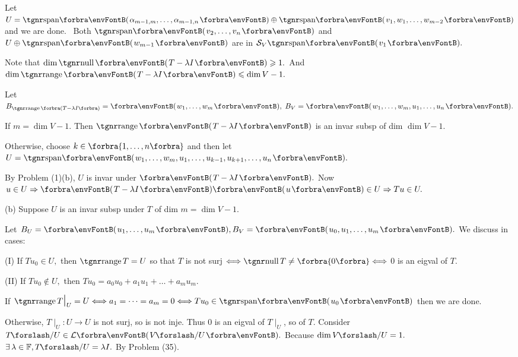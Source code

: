 \documentclass[a4paper, 11pt, UTF8]{article}
\begin{document}
\begin{large}
Let $U=\Span{\alpha_{m-1,m},\dots,\alpha_{m-1,n}}\oplus\Span{v_1,w_1,\dots,w_{m-2}}$ and we are done.\PfEnd\quad\Ha
\Comment \,\,\,Both $\Span{v_2,\dots,v_n}$ and $U\oplus\Span{w_{m-1}}$ are in $\mathcal{S}_V \Span{v_1}.$\par\quad\Ha
{}\par\vspace{6pt}\quad\Ha
\Or Note that $\dim\null\Par{T-\lambda I}\geqslant 1.$ And $\dim\range\Par{T-\lambda I}\leqslant\dim V-1.$\par\quad\Ha
Let $B_{\range\SmallPar{T-\lambda I}}=\Par{w_1,\dots,w_m},\;B_V=\Par{w_1,\dots,w_m,u_1,\dots,u_n}.$\par\quad\Ha
If $m=\dim V-1.$  Then $\range\Par{T-\lambda I}$ is an invar subsp of dim $\dim V-1.$\par\quad\Ha
Otherwise, choose $k\in\Bra{1,\dots,n}$ and then let $U=\Span{w_1,\dots,w_m,u_1,\dots,u_{k-1},u_{k+1},\dots,u_n}.$\par\quad\Ha
By Problem (1)(b), $U$ is invar under $\Par{T-\lambda I}.$ Now $u\in U\Rightarrow \Par{T-\lambda I}\Par{u}\in U\Rightarrow Tu\in U.$\par\vspace{6pt}\quad
(b) Suppose $U$ is an invar subsp under $T$ of dim $m=\dim V-1.$ \par\quad\Hb
Let $B_U=\Par{u_1,\dots,u_m},B_V=\Par{u_0,u_1,\dots,u_m}.$ We discuss in cases:\par\quad\Hb
(I) If $Tu_0\in U,$ then $\range T=U$ so that $T$ is not surj $\Longleftrightarrow \null T\neq\zeroSubs\Longleftrightarrow$ $0$ is an eigval of $T.$\par\quad\Hb\EndI
(II) If $Tu_0\not\in U,$ then $Tu_0=a_0 u_0+a_1 u_1+\dots+a_mu_m.$\par\quad\Hb\EndII
If $\range T\mid_U=U\Longleftrightarrow a_1=\dots=a_m=0\Longleftrightarrow Tu_0\in\Span{u_0}$ then we are done.\par\quad\Hb\EndII
Otherwise, $T\mid_U:U\rightarrow U$ is not surj, so is not inje. Thus $0$ is an eigval of $T\mid_U$, so of $T.$\PfEnd\vspace{4pt}\quad\Hb
\Or Consider $T\mySlash U\in\Lm{V\mySlash U}.$ Because $\dim V\mySlash U=1.$ $\exists\,\lambda\in\Fbb,T\mySlash U=\lambda I.$ By Problem (35).\PfEnd
\SepLine
\ChEnd\pagebreak

\large\vspace{5pt}


\end{large}
\end{document}

